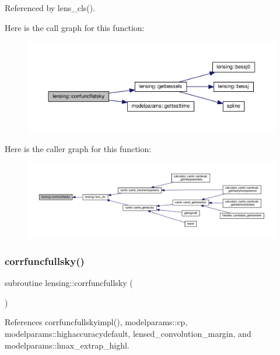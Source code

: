 Referenced by lens\+\_\+cls().

Here is the call graph for this function\+:
\nopagebreak
\begin{figure}[H]
\begin{center}
\leavevmode
\includegraphics[width=350pt]{namespacelensing_aa3cc70dd58b493d3192e97f675ffa909_cgraph}
\end{center}
\end{figure}
Here is the caller graph for this function\+:
\nopagebreak
\begin{figure}[H]
\begin{center}
\leavevmode
\includegraphics[width=350pt]{namespacelensing_aa3cc70dd58b493d3192e97f675ffa909_icgraph}
\end{center}
\end{figure}
\mbox{\label{namespacelensing_a18ba748aa475681b240cdd9be79dd809}} 
\subsubsection{\texorpdfstring{corrfuncfullsky()}{corrfuncfullsky()}}
{\footnotesize\ttfamily subroutine lensing\+::corrfuncfullsky (\begin{DoxyParamCaption}{ }\end{DoxyParamCaption})}



References corrfuncfullskyimpl(), modelparams\+::cp, modelparams\+::highaccuracydefault, lensed\+\_\+convolution\+\_\+margin, and modelparams\+::lmax\+\_\+extrap\+\_\+highl.



